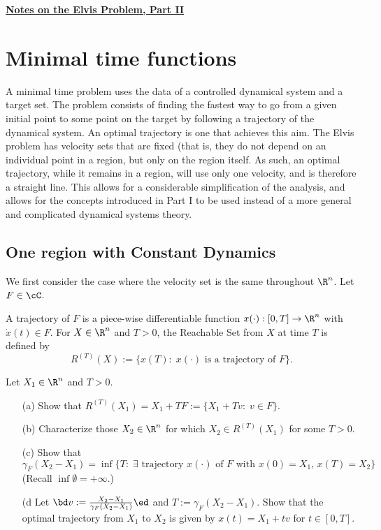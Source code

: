\documentclass[12pt]{article}
\begin{document}
\setcounter{section}{4}
\setcounter{figure}{0
}


\begin{center}
{\LARGE\bf\underline{Notes on the Elvis Problem, Part II}}
\end{center}


\section{Minimal time functions}\label{sec: min time}
A minimal time problem uses the data of a controlled dynamical system and a target set.  The problem consists of finding the fastest way to go from a given initial point to some point on the target by following a trajectory of the dynamical system.  An optimal trajectory is one that achieves this aim.  The Elvis problem has velocity sets that are fixed (that is, they do not depend on an individual point in a region, but only on the region itself.  As such, an optimal trajectory, while it remains in a region, will use only one velocity, and is therefore a straight line.  This allows for a considerable simplification of the analysis, and allows for the concepts introduced in Part I to be used instead of a more general and complicated dynamical systems theory.   

\subsection{One region with Constant Dynamics}
We first consider the case where the velocity set is the same throughout $\R^n$.  Let $F\in\cC$.  

\begin{defn}
A trajectory of $F$ is a piece-wise differentiable function $x(\cdot):[0,T]\to\R^n$ with $\dot x(t)\in F$.
For $X\in\R^n$ and $T>0$, the Reachable Set from $X$ at time $T$ is defined by 
\[
R^{(T)}(X):=\bigl\{x(T):\;x(\cdot)\text{ is a trajectory of } F\bigr\}.
\]
\end{defn}

{\blue
\begin{exer}  Let $X_1\in\R^n$ and $T>0$.
\begin{itemize}
\item[(a)]  Show that $R^{(T)}(X_1)=X_1+TF:=\bigl\{X_1+Tv:\;v\in F\bigr\}$.
\item[(b)]  Characterize those $X_2\in\R^n$ for which $X_2\in R^{(T)}(X_1)$ for some $T>0$. 
\item[(c)]  Show that
\[
\gamma_F\left(X_2-X_1\right)=\inf\biggl\{T:\;\exists \text{ trajectory }x(\cdot)\text{ of }F\text{ with }x(0)=X_1,\,x(T)=X_2\biggr\}
\]
(Recall $\inf\emptyset=+\infty$.)
\item[(d]  Let $\bd v:=\frac{X_2-X_1}{\gamma_F(X_2-X_1)}\ed$ and $T:=\gamma_F(X_2-X_1)$.  Show that the optimal trajectory from $X_1$ to $X_2$ is given by $x(t)=X_1+ t v$ for $t\in[0,T]$.
\end{itemize}
\end{exer}
}
\end{document}
